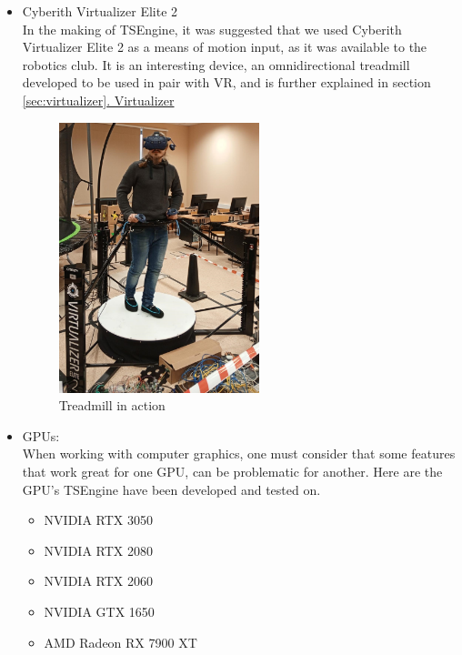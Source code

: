 \begin{itemize}
\begin{itemize}
    \end{itemize}
    \item Cyberith Virtualizer Elite 2\\
    In the making of TSEngine, it was suggested  that we used Cyberith Virtualizer Elite 2 as a means of motion input, as it was available to the robotics club. It is an interesting device, an omnidirectional treadmill developed to be used in pair with VR, and is further explained in section \hyperref[sec:virtualizer]{\ref*{sec:virtualizer}. Virtualizer}
    \begin{figure}[H]
    \begin{center}
     \includegraphics[width=0.55\textwidth]{figures/dominik.png}
    \end{center}
      \caption{Treadmill in action}
    \end{figure}
    \item GPUs:\\
    When working with computer graphics, one must consider that some features that work great for one GPU, can be problematic for another. Here are the GPU's TSEngine have been developed and tested on.
    \begin{itemize}
        \item NVIDIA RTX 3050\\
        \item NVIDIA RTX 2080\\
        \item NVIDIA RTX 2060\\
        \item NVIDIA GTX 1650\\
        \item AMD Radeon RX 7900 XT\\
    \end{itemize}
\end{itemize}
  

